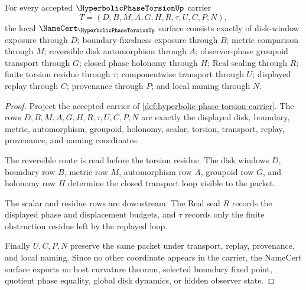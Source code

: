 \begin{theorem}
\label{thm:hyperbolic-phase-torsion-namecert-obligations}
For every accepted $\HyperbolicPhaseTorsionUp$ carrier
$$
T=(D,B,M,A,G,H,R,\tau,U,C,P,N),
$$
the local $\NameCert_{\HyperbolicPhaseTorsionUp}$ surface consists exactly of disk-window exposure through $D$; boundary-fixedness exposure through $B$; metric comparison through $M$; reversible disk automorphism through $A$; observer-phase groupoid transport through $G$; closed phase holonomy through $H$; Real sealing through $R$; finite torsion residue through $\tau$; componentwise transport through $U$; displayed replay through $C$; provenance through $P$; and local naming through $N$.
\end{theorem}
\begin{proof}
Project the accepted carrier of \autoref{def:hyperbolic-phase-torsion-carrier}. The rows $D,B,M,A,G,H,R,\tau,U,C,P,N$ are exactly the displayed disk, boundary, metric, automorphism, groupoid, holonomy, scalar, torsion, transport, replay, provenance, and naming coordinates.

The reversible route is read before the torsion residue. The disk windows $D$, boundary row $B$, metric row $M$, automorphism row $A$, groupoid row $G$, and holonomy row $H$ determine the closed transport loop visible to the packet.

The scalar and residue rows are downstream. The Real seal $R$ records the displayed phase and displacement budgets, and $\tau$ records only the finite obstruction residue left by the replayed loop.

Finally $U,C,P,N$ preserve the same packet under transport, replay, provenance, and local naming. Since no other coordinate appears in the carrier, the NameCert surface exports no host curvature theorem, selected boundary fixed point, quotient phase equality, global disk dynamics, or hidden observer state.
\end{proof}


